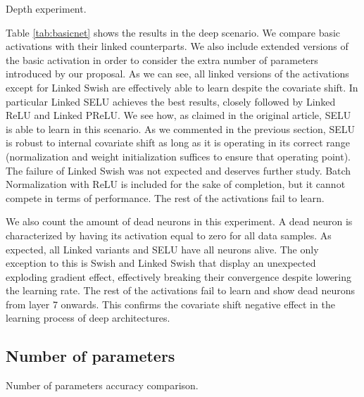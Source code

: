 \documentclass[10pt,twocolumn,letterpaper]{article}
\begin{document}
\begin{table}[h]
    \centering
    
    \caption{Depth experiment.}
    \label{tab:basicnet}
\end{table}

Table  \ref{tab:basicnet} shows the results in the deep scenario. We compare basic activations with their linked counterparts. We also include extended versions of the basic activation in order to consider the extra number of parameters introduced by our proposal. As we can see, all linked versions of the activations except for Linked Swish are effectively able to learn despite the covariate shift. In particular Linked SELU achieves the best results, closely followed by Linked ReLU and Linked PReLU. We see how, as claimed in the original article, SELU is able to learn in this scenario. As we commented in the previous section, SELU is robust to internal covariate shift as long as it is operating in its correct range (normalization and weight initialization suffices to ensure that operating point). The failure of Linked Swish was not expected and deserves further study. Batch Normalization with ReLU is included for the sake of completion, but it cannot compete in terms of performance. The rest of the activations fail to learn. 

We also count the amount of dead neurons in this experiment. A dead neuron is characterized by having its activation equal to zero for all data samples. As expected, all Linked variants and SELU have all neurons alive. The only exception to this is Swish and Linked Swish that display an unexpected exploding gradient effect, effectively breaking their convergence despite lowering the learning rate. The rest of the activations fail to learn and show dead neurons from layer 7 onwards. This confirms the covariate shift negative effect in the learning process of deep architectures.

\subsection{Number of parameters}

\begin{table}[h]
    \centering
    
    
    \caption{Number of parameters accuracy comparison.}
    \label{tab:doubles}
\end{table}
\end{document}
